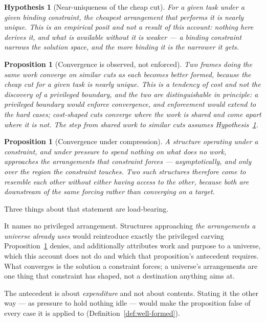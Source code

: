 \documentclass[11pt,a4paper]{article}
\newtheorem{proposition}[definition]{Proposition}
\newtheorem{hypothesis}[definition]{Hypothesis}
\theoremstyle{remark}\newtheorem{remark}[definition]{Remark}
\begin{document}
\begin{hypothesis}[Near-uniqueness of the cheap cut]\label{hyp:cheap-cut}
For a given task under a given binding constraint, the cheapest arrangement that performs it is nearly
unique. This is an empirical posit and not a result of this account: nothing here derives it, and what
is available without it is weaker --- a binding constraint narrows the solution space, and the more
binding it is the narrower it gets.
\end{hypothesis}

\begin{proposition}[Convergence is observed, not enforced]\label{prop:convergence-observed}
Two frames doing the same work converge on similar cuts as each becomes better formed, because the
cheap cut for a given task is nearly unique. This is a tendency of cost and not the discovery of a
privileged boundary, and the two are distinguishable in principle: a privileged boundary would
\emph{enforce} convergence, and enforcement would extend to the hard cases; cost-shaped cuts converge
where the work is shared and come apart where it is not. The step from shared work to similar cuts
assumes Hypothesis~\ref{hyp:cheap-cut}.
\end{proposition}

\begin{proposition}[Convergence under compression]\label{prop:compression-convergence}
A structure operating under a constraint, and under pressure to spend nothing on what does no work,
approaches the arrangements that constraint forces --- asymptotically, and only over the region the
constraint touches. Two such structures therefore come to resemble each other without either having
access to the other, because both are downstream of the same forcing rather than converging on a
target.
\end{proposition}

Three things about that statement are load-bearing.

It names no privileged arrangement. Structures approaching \emph{the arrangements a universe already uses} would reintroduce exactly the privileged carving
Proposition~\ref{prop:convergence-observed} denies, and additionally attributes work and purpose to a
universe, which this account does not do and which that proposition's antecedent requires. What
converges is the solution a constraint forces; a universe's arrangements are one thing that
constraint has shaped, not a destination anything aims at.

The antecedent is about \emph{expenditure} and not about contents. Stating it the other way --- as
pressure to hold nothing idle --- would make the proposition false of every case it is applied to
(Definition~\ref{def:well-formed}).
\end{document}
